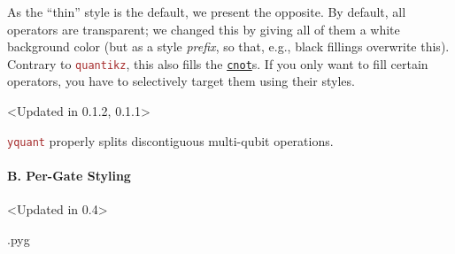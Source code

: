 \documentclass{scrartcl}
\makeatletter
\newenvironment{codeexample}{%
   \VerbatimEnvironment%
   \let\FVB@VerbatimOut\minted@FVB@VerbatimOut
   \let\FVE@VerbatimOut\minted@FVE@VerbatimOut
   \minted@configlang{tex}%
   \minted@fvset
   \begin{VerbatimOut}[codes={\catcode`\^^I=12},firstline,lastline]{\minted@jobname.pyg}%
}{
   \end{VerbatimOut}%
   \minted@langlinenoson%
   \savebox\codeexamplebox{ \minted@jobname.pyg}%
   \ifdim\wd\codeexamplebox>\dimexpr.5\linewidth-3mm\relax%
      \wd\codeexamplebox=.5\linewidth%
   \else%
      \wd\codeexamplebox=\dimexpr\wd\codeexamplebox+3mm\relax%
   \fi%
   \noindent\begin{minipage}{\wd\codeexamplebox}%
      \centering%
      \usebox\codeexamplebox%
   \end{minipage}%
   \begin{minipage}{\dimexpr\linewidth-\wd\codeexamplebox\relax}%
      \minted@pygmentize{\minted@lang}%
   \end{minipage}%
   \minted@langlinenosoff%
   \par%
}
\newenvironment{codeexample*}{%
   \VerbatimEnvironment%
   \let\FVB@VerbatimOut\minted@FVB@VerbatimOut
   \let\FVE@VerbatimOut\minted@FVE@VerbatimOut
   \minted@configlang{tex}%
   \minted@fvset
   \begin{VerbatimOut}[codes={\catcode`\^^I=12},firstline,lastline]{\minted@jobname.pyg}%
}{
   \end{VerbatimOut}%
   \minted@langlinenoson%
   \begin{adjustbox}{center}
       \minted@jobname.pyg %
   \end{adjustbox}\nopagebreak
   \minted@pygmentize{\minted@lang}%
   \minted@langlinenosoff%
   \par%
}
\def\pkg#1{\textcolor{brown}{\texttt{#1}}}
\def\gate#1{\hyperref[gate:#1]{\texttt{#1}}}
\def\Yquant{\pkg{yquant}}
\makeatother
\begin{document}
               \begin{example}
                  \begin{codeexample*}
                  \end{codeexample*}
                  As the ``thin'' style is the default, we present the opposite.
                  By default, all operators are transparent; we changed this by giving all of them a white background color (but as a style \emph{prefix}, so that, e.g., black fillings overwrite this).
                  Contrary to \pkg{quantikz}, this also fills the \gate{cnot}s.
                  If you only want to fill certain operators, you have to selectively target them using their styles.
               \end{example}

               \begin{example}<Updated in 0.1.2, 0.1.1>
                  \begin{codeexample*}
                  \end{codeexample*}
                  \Yquant{} properly splits discontiguous multi\hyp qubit operations.
               \end{example}

            \paragraph{B. Per-Gate Styling}\leavevmode
               \begin{example}<Updated in 0.4>
                  \begin{codeexample}
                  \end{codeexample}
               \end{example}
\end{document}
